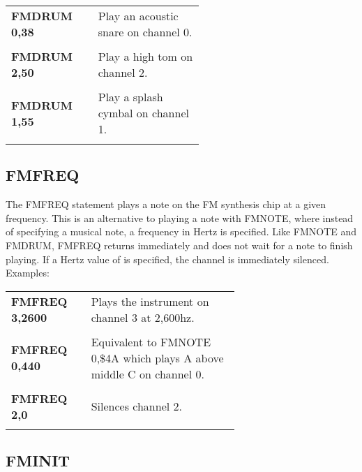 \begin{tabular}{l p{0.55\linewidth}}

	{\ttfamily\bfseries FMDRUM 0,38}&Play an acoustic snare on channel 0.\\\\

	{\ttfamily\bfseries FMDRUM 2,50}&Play a high tom on channel 2.\\\\

	{\ttfamily\bfseries FMDRUM 1,55}&Play a splash cymbal on channel 1.\\\\

\end{tabular}

\subsection{FMFREQ}

The {\ttfamily FMFREQ} statement plays a note on the FM synthesis chip at a
given frequency.  This is an alternative to playing a note with {\ttfamily
FMNOTE}, where instead of specifying a musical note, a frequency in Hertz is
specified.  Like {\ttfamily FMNOTE} and {\ttfamily FMDRUM}, {\ttfamily FMFREQ}
returns immediately and does not wait for a note to finish playing.  If a Hertz
value of {} is specified, the channel is immediately silenced.\\

Examples:\\

\begin{tabular}{l p{0.65\linewidth}}

	{\ttfamily\bfseries FMFREQ 3,2600}&Plays the instrument on channel 3 at 2,600hz.\\\\

	{\ttfamily\bfseries FMFREQ 0,440}&Equivalent to {\ttfamily FMNOTE 0,\$4A}
	which plays A above middle C on channel 0.\\\\

	{\ttfamily\bfseries FMFREQ 2,0}&Silences channel 2.\\\\

\end{tabular}

\subsection{FMINIT}

